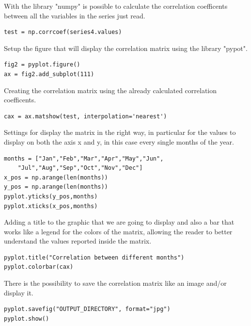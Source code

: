 With the library "numpy" is possible to calculate the correlation coefficents between all the variables in the series just read.
\begin{lstlisting}
test = np.corrcoef(series4.values)
\end{lstlisting}

Setup the figure that will display the correlation matrix using the library "pypot".
\begin{lstlisting}
fig2 = pyplot.figure()
ax = fig2.add_subplot(111)
\end{lstlisting}

Creating the correlation matrix using the already calculated correlation coefficents.
\begin{lstlisting}
cax = ax.matshow(test, interpolation='nearest')
\end{lstlisting}

Settings for display the matrix in the right way, in particular for the values to display on both the axis x and y, in this case every single months of the year.
\begin{lstlisting}
months = ["Jan","Feb","Mar","Apr","May","Jun",
	"Jul","Aug","Sep","Oct","Nov","Dec"]
x_pos = np.arange(len(months))
y_pos = np.arange(len(months))
pyplot.yticks(y_pos,months)
pyplot.xticks(x_pos,months)
\end{lstlisting}
\newpage
Adding a title to the graphic that we are going to display and also a bar that works like a legend for the colors of the matrix, allowing the reader to better understand the values reported inside the matrix.
\begin{lstlisting}
pyplot.title("Correlation between different months")
pyplot.colorbar(cax)
\end{lstlisting}

There is the possibility to save the correlation matrix like an image and/or display it.
\begin{lstlisting}
pyplot.savefig("OUTPUT_DIRECTORY", format="jpg")
pyplot.show()
\end{lstlisting}

